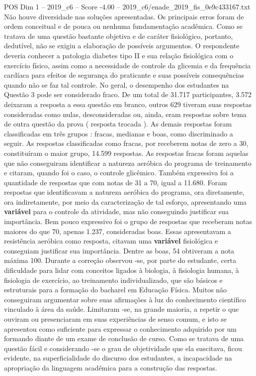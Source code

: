 \begin{textsample}{POS Dim 1 – 2019\_c6 – Score -4.00 – 2019\_c6/enade\_2019\_fis\_0e9c433167.txt}
Não houve diversidade nas soluções apresentadas.
Os principais erros foram de ordem conceitual e de pouca ou nenhuma fundamentação acadêmica.
Como se tratava de uma questão bastante objetiva e de caráter fisiológico, portanto, dedutível, não se exigiu a elaboração de possíveis argumentos.
O respondente deveria conhecer a patologia diabetes tipo II e sua relação fisiológica com o exercício físico, assim como a necessidade de controle da glicemia e da frequência cardíaca para efeitos de segurança do praticante e suas possíveis consequências quando não se faz tal controle.
No geral, o desempenho dos estudantes na Questão 3 pode ser considerado fraco.
De um total de 31.717 participantes, 3.572 deixaram a resposta a essa questão em branco, outros 629 tiveram suas respostas consideradas como nulas, desconsideradas ou, ainda, eram respostas sobre tema de outra questão da prova ( resposta trocada ).
As demais respostas foram classificadas em três grupos : fracas, medianas e boas, como discriminado a seguir.
As respostas classificadas como fracas, por receberem notas de zero a 30, constituíram o maior grupo, 14.599 respostas.
As respostas fracas foram aquelas que não conseguiram identificar a natureza aeróbica do programa de treinamento e citaram, quando foi o caso, o controle glicêmico.
Também expressiva foi a quantidade de respostas que com notas de 31 a 70, igual a 11.680.
Foram respostas que identificavam a natureza aeróbica do programa, ora diretamente, ora indiretamente, por meio da caracterização de tal esforço, apresentando uma \textbf{variável} para o controle da atividade, mas não conseguindo justificar sua importância.
Bem pouco expressivo foi o grupo de respostas que receberam notas maiores do que 70, apenas 1.237, consideradas boas.
Essas apresentavam a resistência aeróbica como resposta, citavam uma \textbf{variável} fisiológica e conseguiam justificar sua importância.
Dentre as boas, 54 obtiveram a nota máxima 100.
Durante a correção observou -se, por parte do estudante, certa dificuldade para lidar com conceitos ligados à biologia, à fisiologia humana, à fisiologia de exercício, ao treinamento individualizado, que são básicos e estruturais para a formação do bacharel em Educação Física.
Muitos não conseguiram argumentar sobre suas afirmações à luz do conhecimento científico vinculado à área da saúde.
Limitaram -se, na grande maioria, a repetir o que ouviram ou presenciaram em suas experiências de senso comum, e isto se apresentou como suficiente para expressar o conhecimento adquirido por um formando diante de um exame de conclusão de curso.
Como se tratava de uma questão fácil e considerando -se o grau de objetividade que ela suscitava, ficou evidente, na superficialidade do discurso dos estudantes, a incapacidade na apropriação da linguagem acadêmica para a construção das respostas.

\end{textsample}
